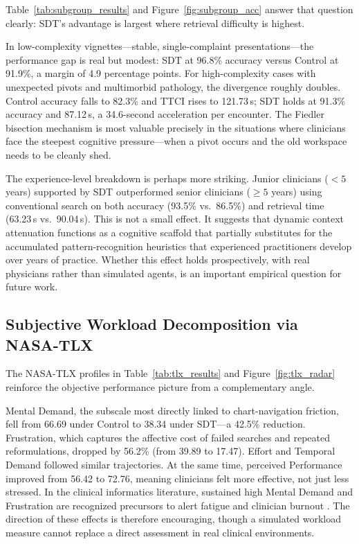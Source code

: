 \documentclass[10pt, onecolumn]{article}
\begin{document}
Table~\ref{tab:subgroup_results} and Figure~\ref{fig:subgroup_acc} answer that question clearly: SDT's advantage is largest where retrieval difficulty is highest.

In low-complexity vignettes---stable, single-complaint presentations---the performance gap is real but modest: SDT at 96.8\% accuracy versus Control at 91.9\%, a margin of 4.9 percentage points. For high-complexity cases with unexpected pivots and multimorbid pathology, the divergence roughly doubles. Control accuracy falls to 82.3\% and TTCI rises to 121.73\,s; SDT holds at 91.3\% accuracy and 87.12\,s, a 34.6-second acceleration per encounter. The Fiedler bisection mechanism is most valuable precisely in the situations where clinicians face the steepest cognitive pressure---when a pivot occurs and the old workspace needs to be cleanly shed.

The experience-level breakdown is perhaps more striking. Junior clinicians ($<5$ years) supported by SDT outperformed senior clinicians ($\ge 5$ years) using conventional search on both accuracy (93.5\% vs.\ 86.5\%) and retrieval time (63.23\,s vs.\ 90.04\,s). This is not a small effect. It suggests that dynamic context attenuation functions as a cognitive scaffold that partially substitutes for the accumulated pattern-recognition heuristics that experienced practitioners develop over years of practice. Whether this effect holds prospectively, with real physicians rather than simulated agents, is an important empirical question for future work.

\subsection{Subjective Workload Decomposition via NASA-TLX}

The NASA-TLX profiles in Table~\ref{tab:tlx_results} and Figure~\ref{fig:tlx_radar} reinforce the objective performance picture from a complementary angle.

Mental Demand, the subscale most directly linked to chart-navigation friction, fell from 66.69 under Control to 38.34 under SDT---a 42.5\% reduction. Frustration, which captures the affective cost of failed searches and repeated reformulations, dropped by 56.2\% (from 39.89 to 17.47). Effort and Temporal Demand followed similar trajectories. At the same time, perceived Performance improved from 56.42 to 72.76, meaning clinicians felt more effective, not just less stressed. In the clinical informatics literature, sustained high Mental Demand and Frustration are recognized precursors to alert fatigue and clinician burnout \cite{harry2018cognitive,tubbs2020balancing}. The direction of these effects is therefore encouraging, though a simulated workload measure cannot replace a direct assessment in real clinical environments.
\end{document}
